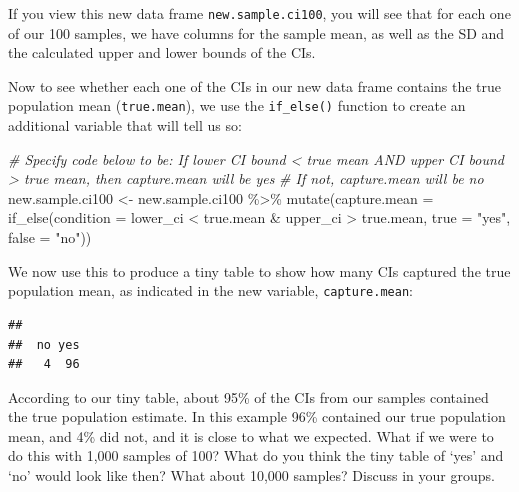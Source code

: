 \documentclass[
]{book}
\newenvironment{Shaded}{\begin{snugshade}}{\end{snugshade}}
\newcommand{\AttributeTok}[1]{\textcolor[rgb]{0.77,0.63,0.00}{#1}}
\newcommand{\CommentTok}[1]{\textcolor[rgb]{0.56,0.35,0.01}{\textit{#1}}}
\newcommand{\FunctionTok}[1]{\textcolor[rgb]{0.00,0.00,0.00}{#1}}
\newcommand{\NormalTok}[1]{#1}
\newcommand{\OtherTok}[1]{\textcolor[rgb]{0.56,0.35,0.01}{#1}}
\newcommand{\SpecialCharTok}[1]{\textcolor[rgb]{0.00,0.00,0.00}{#1}}
\newcommand{\StringTok}[1]{\textcolor[rgb]{0.31,0.60,0.02}{#1}}
\begin{document}
If you view this new data frame \texttt{new.sample.ci100}, you will see that for each one of our 100 samples, we have columns for the sample mean, as well as the SD and the calculated upper and lower bounds of the CIs.

Now to see whether each one of the CIs in our new data frame contains the true population mean (\texttt{true.mean}), we use the \texttt{if\_else()} function to create an additional variable that will tell us so:

\begin{Shaded}
\begin{Highlighting}[]
\CommentTok{\# Specify code below to be: If lower CI bound \textless{} true mean AND upper CI bound \textgreater{} true mean, then \textquotesingle{}capture.mean\textquotesingle{} will be \textquotesingle{}yes\textquotesingle{} }
\CommentTok{\# If not, \textquotesingle{}capture.mean\textquotesingle{} will be \textquotesingle{}no\textquotesingle{}}
\NormalTok{new.sample.ci100 }\OtherTok{\textless{}{-}}\NormalTok{ new.sample.ci100 }\SpecialCharTok{\%\textgreater{}\%} 
  \FunctionTok{mutate}\NormalTok{(}\AttributeTok{capture.mean =} \FunctionTok{if\_else}\NormalTok{(}\AttributeTok{condition =}\NormalTok{ lower\_ci }\SpecialCharTok{\textless{}}\NormalTok{ true.mean }\SpecialCharTok{\&}\NormalTok{ upper\_ci }\SpecialCharTok{\textgreater{}}\NormalTok{ true.mean, }\AttributeTok{true =} \StringTok{"yes"}\NormalTok{, }\AttributeTok{false =} \StringTok{"no"}\NormalTok{)) }
\end{Highlighting}
\end{Shaded}

We now use this to produce a tiny table to show how many CIs captured the true population mean, as indicated in the new variable, \texttt{capture.mean}:

\begin{Shaded}
\end{Shaded}

\begin{verbatim}
## 
##  no yes 
##   4  96
\end{verbatim}

According to our tiny table, about 95\% of the CIs from our samples contained the true population estimate. In this example 96\% contained our true population mean, and 4\% did not, and it is close to what we expected. What if we were to do this with 1,000 samples of 100? What do you think the tiny table of `yes' and `no' would look like then? What about 10,000 samples? Discuss in your groups.
\end{document}
